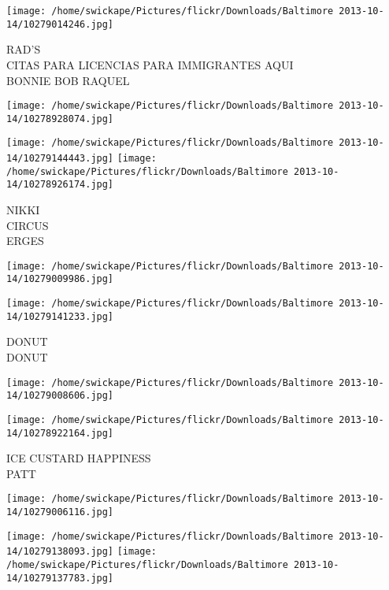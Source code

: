 \documentclass[10pt,letterpaper]{article}
\begin{document}
\vspace{0.25in}
\texttt{[image: /home/swickape/Pictures/flickr/Downloads/Baltimore 2013-10-14/10279014246.jpg]}

RAD'S\\
CITAS PARA LICENCIAS PARA IMMIGRANTES AQUI\\
BONNIE BOB RAQUEL\\
\pagebreak

\texttt{[image: /home/swickape/Pictures/flickr/Downloads/Baltimore 2013-10-14/10278928074.jpg]}

\vspace{0.25in}
\texttt{[image: /home/swickape/Pictures/flickr/Downloads/Baltimore 2013-10-14/10279144443.jpg]}
\texttt{[image: /home/swickape/Pictures/flickr/Downloads/Baltimore 2013-10-14/10278926174.jpg]}

NIKKI\\
CIRCUS\\
ERGES\\
\pagebreak

\texttt{[image: /home/swickape/Pictures/flickr/Downloads/Baltimore 2013-10-14/10279009986.jpg]}

\vspace{0.25in}
\texttt{[image: /home/swickape/Pictures/flickr/Downloads/Baltimore 2013-10-14/10279141233.jpg]}

DONUT\\
DONUT\\
\pagebreak

\texttt{[image: /home/swickape/Pictures/flickr/Downloads/Baltimore 2013-10-14/10279008606.jpg]}

\vspace{0.25in}
\texttt{[image: /home/swickape/Pictures/flickr/Downloads/Baltimore 2013-10-14/10278922164.jpg]}

ICE CUSTARD HAPPINESS\\
PATT\\
\pagebreak

\texttt{[image: /home/swickape/Pictures/flickr/Downloads/Baltimore 2013-10-14/10279006116.jpg]}

\vspace{0.25in}
\texttt{[image: /home/swickape/Pictures/flickr/Downloads/Baltimore 2013-10-14/10279138093.jpg]}
\texttt{[image: /home/swickape/Pictures/flickr/Downloads/Baltimore 2013-10-14/10279137783.jpg]}
\end{document}
